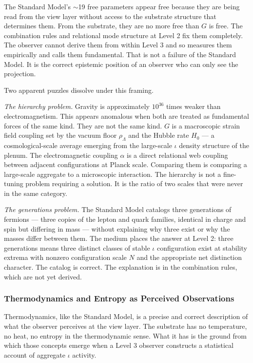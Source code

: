 \documentclass[11pt,letterpaper]{article}
\begin{document}
The Standard Model's \(\sim\)19 free parameters appear free because they are being read from the view layer without access to the substrate structure that determines them. From the substrate, they are no more free than \(G\) is free. The combination rules and relational mode structure at Level 2 fix them completely. The observer cannot derive them from within Level 3 and so measures them empirically and calls them fundamental. That is not a failure of the Standard Model. It is the correct epistemic position of an observer who can only see the projection.

Two apparent puzzles dissolve under this framing.

\emph{The hierarchy problem.} Gravity is approximately \(10^{36}\) times weaker than electromagnetism. This appears anomalous when both are treated as fundamental forces of the same kind. They are not the same kind. \(G\) is a macroscopic strain field coupling set by the vacuum floor \(\rho_\Lambda\) and the Hubble rate \(H_0\) --- a cosmological-scale average emerging from the large-scale \(\iota\) density structure of the plenum. The electromagnetic coupling \(\alpha\) is a direct relational web coupling between adjacent configurations at Planck scale. Comparing them is comparing a large-scale aggregate to a microscopic interaction. The hierarchy is not a fine-tuning problem requiring a solution. It is the ratio of two scales that were never in the same category.

\emph{The generations problem.} The Standard Model catalogs three generations of fermions --- three copies of the lepton and quark families, identical in charge and spin but differing in mass --- without explaining why three exist or why the masses differ between them. The medium places the answer at Level 2: three generations means three distinct classes of stable \(\iota\) configuration exist at stability extrema with nonzero configuration scale \(N\) and the appropriate net distinction character. The catalog is correct. The explanation is in the combination rules, which are not yet derived.

\subsubsection{Thermodynamics and Entropy as Perceived Observations}
\label{sec:org37a6694}

Thermodynamics, like the Standard Model, is a precise and correct description of what the observer perceives at the view layer. The substrate has no temperature, no heat, no entropy in the thermodynamic sense. What it has is the ground from which those concepts emerge when a Level 3 observer constructs a statistical account of aggregate \(\iota\) activity.
\end{document}
